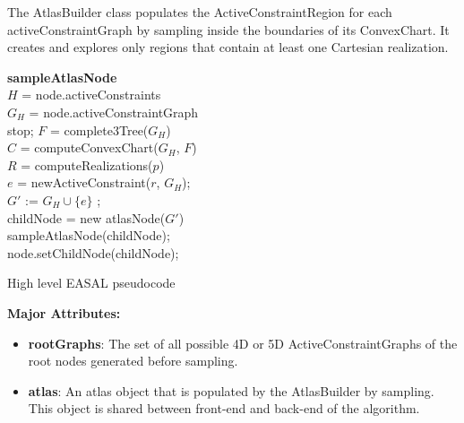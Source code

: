 The AtlasBuilder class populates the ActiveConstraintRegion for each
activeConstraintGraph by sampling inside the boundaries of its ConvexChart. 
It creates and explores only regions that contain at least one Cartesian
realization. 

\begin{algorithm} [htbp]

 {\bf sampleAtlasNode}\\
 \BlankLine
 \LinesNumbered
	$H$ = node.activeConstraints\\
	$G_H$ = node.activeConstraintGraph\\
		{stop;	}
	$F$ = complete3Tree($G_H$)\\
	
	$C$ = computeConvexChart($G_H$, $F$)\\

	{
		$R$ = computeRealizations($p$)\\

		{
			{
				{
					$e$ = newActiveConstraint($r$, $G_H$);\\
					$G'$ := $G_H \cup \{e\}$ ;\\
					{
						childNode = new atlasNode($G'$)\\
						sampleAtlasNode(childNode);\\
					} 
					node.setChildNode(childNode);
				} 
			}
		}
	}

	\caption{High level EASAL pseudocode}
\label{alg:sampleAtlasNode}
\end{algorithm}


\noindent \textbf{Major Attributes:} 
\begin{itemize}
		\item  \textbf{rootGraphs}: The set of all possible 4D or 5D
				ActiveConstraintGraphs of the root nodes
				generated before sampling.
		\item  \textbf{atlas}: An atlas object that is populated by the
				AtlasBuilder by sampling. This object is shared between front-end and
				back-end of the algorithm.
\end{itemize}

